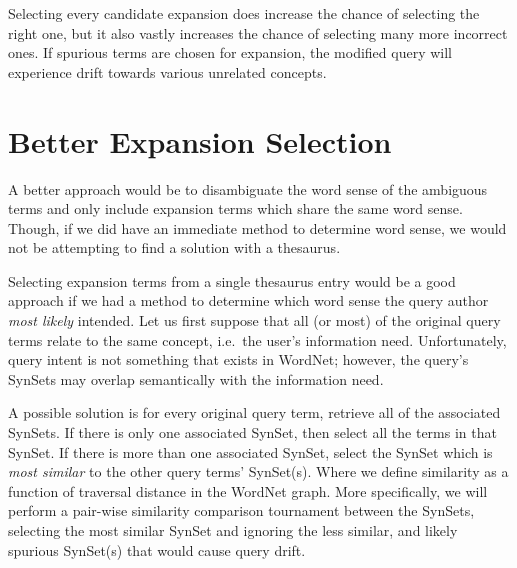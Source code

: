 Selecting every candidate expansion does increase the chance of selecting the right one, but it also vastly increases the chance of selecting many more incorrect ones. If spurious terms are chosen for expansion, the modified query will experience drift towards various unrelated concepts. 




\section{Better Expansion Selection} \label{betterTS}
A better approach would be to disambiguate the word sense of the ambiguous terms and only include expansion terms which share the same word sense. Though, if we did have an immediate method to determine word sense, we would not be attempting to find a solution with a thesaurus.

Selecting expansion terms from a single thesaurus entry would be a good approach if we had a method to determine which word sense the query author \textit{most likely} intended. Let us first suppose that all (or most) of the original query terms relate to the same concept, i.e.\ the user's information need. Unfortunately, query intent is not something that exists in WordNet; however, the query's SynSets may overlap semantically with the information need. 


A possible solution is for every original query term, retrieve all of the associated SynSets. If there is only one associated SynSet, then select all the terms in that SynSet. If there is more than one associated SynSet, select the SynSet which is \textit{most similar} to the other query terms' SynSet(s). Where we define similarity as a function of traversal distance in the WordNet graph. More specifically, we will perform a pair-wise similarity comparison tournament between the SynSets, selecting the most similar SynSet and ignoring the less similar, and likely spurious SynSet(s) that would cause query drift.





